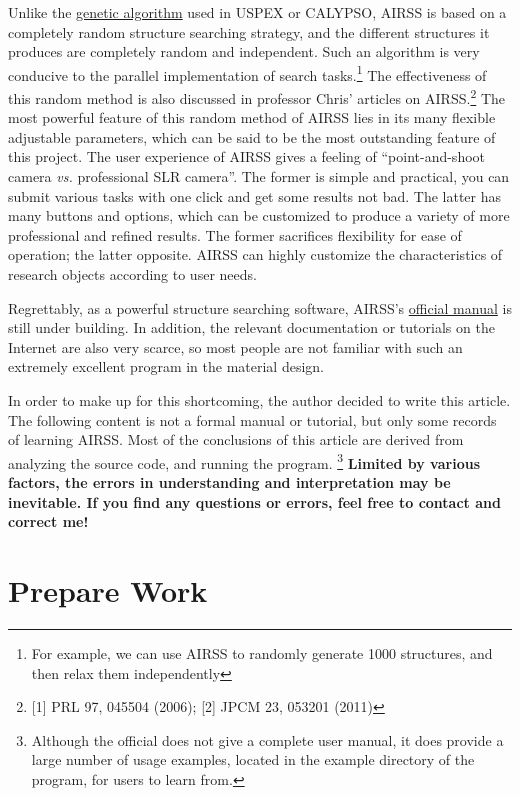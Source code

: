 \documentclass[a4paper, 10pt]{article}
\begin{document}
Unlike the \href{https://en.wikipedia.org/wiki/Genetic_algorithm}{genetic algorithm} used in USPEX or CALYPSO, AIRSS is based on a completely random structure searching strategy, and the different structures it produces are completely random and independent. Such an algorithm is very conducive to the parallel implementation of search tasks.\footnote{For example, we can use AIRSS to randomly generate 1000 structures, and then relax them independently} The effectiveness of this random method is also discussed in professor Chris' articles on AIRSS.\footnote{ [1] PRL 97, 045504 (2006); [2] JPCM 23, 053201 (2011)} The most powerful feature of this random method of AIRSS lies in its many flexible adjustable parameters, which can be said to be the most outstanding feature of this project. The user experience of AIRSS gives a feeling of ``point-and-shoot camera \emph{vs.} professional SLR camera''. The former is simple and practical, you can submit various tasks with one click and get some results not bad. The latter has many buttons and options, which can be customized to produce a variety of more professional and refined results. The former sacrifices flexibility for ease of operation; the latter opposite. AIRSS can highly customize the characteristics of research objects according to user needs.

Regrettably, as a powerful structure searching software, AIRSS's \href{https://airss-docs.github.io/technical-reference/buildcell-manual/}{official manual} is still under building. In addition, the relevant documentation or tutorials on the Internet are also very scarce, so most people are not familiar with such an extremely excellent program in the material design.


In order to make up for this shortcoming, the author decided to write this article. The following content is not a formal manual or tutorial, but only some records of learning AIRSS. Most of the conclusions of this article are derived from analyzing the source code, and running the program. \footnote{Although the official does not give a complete user manual, it does provide a large number of usage examples, located in the example directory of the program, for users to learn from.} \textbf{Limited by various factors, the errors in understanding and interpretation may be inevitable. If you find any questions or errors, feel free to contact and correct me!}


\newpage
\section{Prepare Work}
\end{document}
